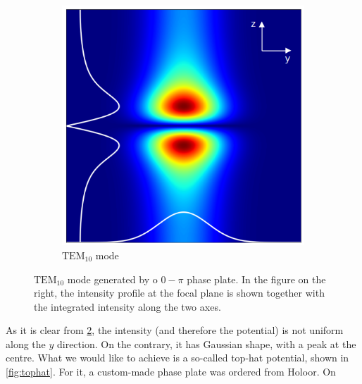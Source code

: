 \begin{figure}
\begin{subfigure}[t]{0.6\textwidth}
        \includegraphics[height=\textwidth, valign=c]{chapters/chapter_2/figures/tem10_sim.png}
        \caption{$\text{TEM}_{10}$ mode}
        \label{fig:tem10}
    \end{subfigure}
    \caption{$\text{TEM}_{10}$ mode generated by o $0-\pi$ phase plate. In the figure on the right, the intensity profile at the focal plane is shown together with the integrated intensity along the two axes.}
\end{figure}

As it is clear from \cref{fig:tem10}, the intensity (and therefore the potential) is not uniform along the $y$ direction. On the contrary, it has Gaussian shape, with a peak at the centre.
What we would like to achieve is a so-called top-hat potential, shown in \cref{fig:tophat}. For it, a custom-made phase plate was ordered from Holoor. On

